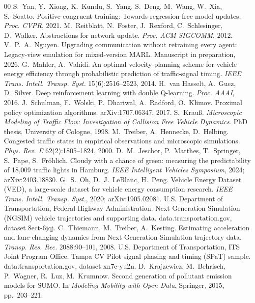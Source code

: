 \begin{thebibliography}{00}
 S.~Yan, Y.~Xiong, K.~Kundu, S.~Yang, S.~Deng, M.~Wang, W.~Xia, S.~Soatto. Positive-congruent training: Towards regression-free model updates. \emph{Proc. CVPR}, 2021.
 M.~Reitblatt, N.~Foster, J.~Rexford, C.~Schlesinger, D.~Walker. Abstractions for network update. \emph{Proc. ACM SIGCOMM}, 2012.
 V.~P.~A.~Nguyen. Upgrading communication without retraining every agent: Legacy-view emulation for mixed-version MARL. Manuscript in preparation, 2026.
 G.~Mahler, A.~Vahidi. An optimal velocity-planning scheme for vehicle energy efficiency through probabilistic prediction of traffic-signal timing. \emph{IEEE Trans. Intell. Transp. Syst.} 15(6):2516--2523, 2014.
 H.~van Hasselt, A.~Guez, D.~Silver. Deep reinforcement learning with double Q-learning. \emph{Proc. AAAI}, 2016.
 J.~Schulman, F.~Wolski, P.~Dhariwal, A.~Radford, O.~Klimov. Proximal policy optimization algorithms. arXiv:1707.06347, 2017.
 S.~Krau{\ss}. \emph{Microscopic Modeling of Traffic Flow: Investigation of Collision Free Vehicle Dynamics}. PhD thesis, University of Cologne, 1998.
 M.~Treiber, A.~Hennecke, D.~Helbing. Congested traffic states in empirical observations and microscopic simulations. \emph{Phys. Rev. E} 62(2):1805--1824, 2000.
 D.~M.~Jeschor, P.~Matthes, T.~Springer, S.~Pape, S.~Fr\"ohlich. Cloudy with a chance of green: measuring the predictability of 18,009 traffic lights in Hamburg. \emph{IEEE Intelligent Vehicles Symposium}, 2024; arXiv:2403.18830.
 G.~S.~Oh, D.~J.~LeBlanc, H.~Peng. Vehicle Energy Dataset (VED), a large-scale dataset for vehicle energy consumption research. \emph{IEEE Trans. Intell. Transp. Syst.}, 2020; arXiv:1905.02081.
 U.S. Department of Transportation, Federal Highway Administration. Next Generation Simulation (NGSIM) vehicle trajectories and supporting data. data.transportation.gov, dataset 8ect-6jqj.
 C.~Thiemann, M.~Treiber, A.~Kesting. Estimating acceleration and lane-changing dynamics from Next Generation Simulation trajectory data. \emph{Transp. Res. Rec.} 2088:90--101, 2008.
 U.S. Department of Transportation, ITS Joint Program Office. Tampa CV Pilot signal phasing and timing (SPaT) sample. data.transportation.gov, dataset xn7c-yu2n.
 D.~Krajzewicz, M.~Behrisch, P.~Wagner, R.~Luz, M.~Krumnow. Second generation of pollutant emission models for SUMO. In \emph{Modeling Mobility with Open Data}, Springer, 2015, pp.~203--221.

\end{thebibliography}
